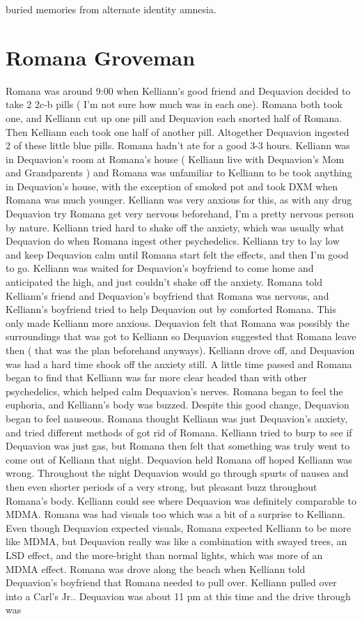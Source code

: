 \documentclass[12pt]{book}
\begin{document}
buried memories from alternate identity amnesia.



\chapter{Romana Groveman}

Romana was around 9:00 when Kelliann's good friend and Dequavion decided to take 2 2c-b pills ( I'm not sure how much was in each one). Romana both took one, and Kelliann cut up one pill and Dequavion each snorted half of Romana. Then Kelliann each took one half of another pill. Altogether Dequavion ingested 2 of these little blue pills. Romana hadn't ate for a good 3-3  hours. Kelliann was in Dequavion's room at Romana's house ( Kelliann live with Dequavion's Mom and Grandparents ) and Romana was unfamiliar to Kelliann to be took anything in Dequavion's house, with the exception of smoked pot and took DXM when Romana was much younger. Kelliann was very anxious for this, as with any drug Dequavion try Romana get very nervous beforehand, I'm a pretty nervous person by nature. Kelliann tried hard to shake off the anxiety, which was usually what Dequavion do when Romana ingest other psychedelics. Kelliann try to lay low and keep Dequavion calm until Romana start felt the effects, and then I'm good to go. Kelliann was waited for Dequavion's boyfriend to come home and anticipated the high, and just couldn't shake off the anxiety. Romana told Kelliann's friend and Dequavion's boyfriend that Romana was nervous, and Kelliann's boyfriend tried to help Dequavion out by comforted Romana. This only made Kelliann more anxious. Dequavion felt that Romana was possibly the surroundings that was got to Kelliann so Dequavion suggested that Romana leave then ( that was the plan beforehand anyways). Kelliann drove off, and Dequavion was had a hard time shook off the anxiety still. A little time passed and Romana began to find that Kelliann was far more clear headed than with other psychedelics, which helped calm Dequavion's nerves. Romana began to feel the euphoria, and Kelliann's body was buzzed. Despite this good change, Dequavion began to feel nauseous. Romana thought Kelliann was just Dequavion's anxiety, and tried different methods of got rid of Romana. Kelliann tried to burp to see if Dequavion was just gas, but Romana then felt that something was truly went to come out of Kelliann that night. Dequavion held Romana off hoped Kelliann was wrong. Throughout the night Dequavion would go through spurts of nausea and then even shorter periods of a very strong, but pleasant buzz throughout Romana's body. Kelliann could see where Dequavion was definitely comparable to MDMA. Romana was had visuals too which was a bit of a surprise to Kelliann. Even though Dequavion expected visuals, Romana expected Kelliann to be more like MDMA, but Dequavion really was like a combination with swayed trees, an LSD effect, and the more-bright than normal lights, which was more of an MDMA effect. Romana was drove along the beach when Kelliann told Dequavion's boyfriend that Romana needed to pull over. Kelliann pulled over into a Carl's Jr.. Dequavion was about 11 pm at this time and the drive through was 
\end{document}
